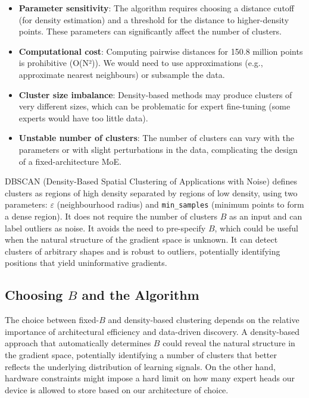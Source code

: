 \begin{itemize}
  \item \textbf{Parameter sensitivity}: The algorithm requires choosing a distance cutoff (for density estimation) and a threshold for the distance to higher-density points. These parameters can significantly affect the number of clusters.
  \item \textbf{Computational cost}: Computing pairwise distances for 150.8 million points is prohibitive (O(N²)). We would need to use approximations (e.g., approximate nearest neighbours) or subsample the data.
  \item \textbf{Cluster size imbalance}: Density-based methods may produce clusters of very different sizes, which can be problematic for expert fine-tuning (some experts would have too little data).
  \item \textbf{Unstable number of clusters}: The number of clusters can vary with the parameters or with slight perturbations in the data, complicating the design of a fixed-architecture MoE.
\end{itemize}


DBSCAN (Density-Based Spatial Clustering of Applications with Noise) defines clusters as regions of high density separated by regions of low density, using two parameters: $\varepsilon$ (neighbourhood radius) and \texttt{min\_samples} (minimum points to form a dense region). It does not require the number of clusters $B$ as an input and can label outliers as noise. It avoids the need to pre-specify $B$, which could be useful when the natural structure of the gradient space is unknown. It can detect clusters of arbitrary shapes and is robust to outliers, potentially identifying positions that yield uninformative gradients.


\subsection{Choosing $B$ and the Algorithm}

The choice between fixed-$B$ and density-based clustering depends on the relative importance of architectural efficiency and data-driven discovery. A density-based approach that automatically determines $B$ could reveal the natural structure in the gradient space, potentially identifying a number of clusters that better reflects the underlying distribution of learning signals. On the other hand, hardware constraints might impose a hard limit on how many expert heads our device is allowed to store based on our architecture of choice.



